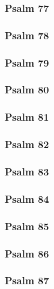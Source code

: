 \documentclass[10pt]{extarticle}
\begin{document}
\begin{multicols}{2}
\subsubsection{Psalm 77}

\newpage

\subsubsection{Psalm 78}

\newpage

\subsubsection{Psalm 79}

\newpage

\subsubsection{Psalm 80}

\newpage

\subsubsection{Psalm 81}

\newpage

\subsubsection{Psalm 82}

\newpage

\subsubsection{Psalm 83}

\newpage

\subsubsection{Psalm 84}

\newpage

\subsubsection{Psalm 85}

\newpage

\subsubsection{Psalm 86}

\newpage

\subsubsection{Psalm 87}

\newpage


\end{multicols}
\end{document}
